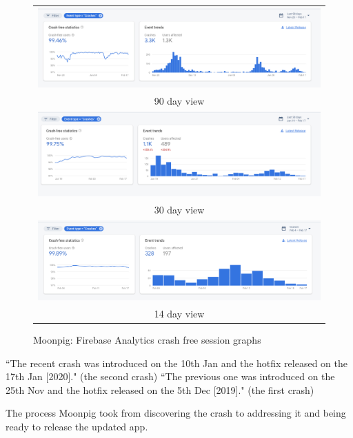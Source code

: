 \begin{figure}
    \centering
    \begin{tabular}{c}
    {\includegraphics[width=14cm]{images/moonpig/firebase_crash_graph_90_days_feb_2020.png}} \\
    90 day view \\
    {\includegraphics[width=14cm]{images/moonpig/firebase_crash_graph_30_days_17_feb_2020.png}} \\
    30 day view \\
    {\includegraphics[width=14cm]{images/moonpig/firebase_crash_graph_14_days_feb_2020.png}} \\
    14 day view
    \end{tabular}
    \caption{Moonpig: Firebase Analytics crash free session graphs}
    \label{fig:moonpig-firebase-feb2020-crash-free-sessions}
\end{figure}




``The recent crash was introduced on the 10th Jan and the hotfix released on the 17th Jan [2020]." (the second crash)
``The previous one was introduced on the 25th Nov and the hotfix released on the 5th Dec [2019]." (the first crash)

The process Moonpig took from discovering the crash to addressing it and being ready to release the updated app.

